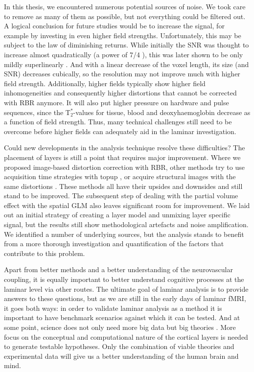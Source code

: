In this thesis, we encountered numerous potential sources of noise. We took care to remove as many of them as possible, but not everything could be filtered out. A logical conclusion for future studies would be to increase the signal, for example by investing in even higher field strengths. Unfortunately, this may be subject to the law of diminishing returns. While initially the SNR was thought to increase almost quadratically (a power of 7/4 \cite{Hoult1979}), this was later shown to be only mildly superlinearly \cite{Hoult2000}. And with a linear decrease of the voxel length, its size (and SNR) decreases cubically, so the resolution may not improve much with higher field strength. Additionally, higher fields typically show higher field inhomogeneities and consequently higher distortions that cannot be corrected with RBR anymore. It will also put higher pressure on hardware and pulse sequences, since the T$_2^*$-values for tissue, blood and deoxyhaemoglobin decrease as a function of field strength. Thus, many technical challenges still need to be overcome before higher fields can adequately aid in the laminar investigation.

Could new developments in the analysis technique resolve these difficulties? The placement of layers is still a point that requires major improvement. Where we proposed image-based distortion correction with RBR, other methods try to use acquisition time strategies with topup \cite{Smith2004}, or acquire structural images with the same distortions \cite{Kashyap2017}. These methods all have their upsides and downsides and still stand to be improved. The subsequent step of dealing with the partial volume effect with the spatial GLM also leaves significant room for improvement. We laid out an initial strategy of creating a layer model and unmixing layer specific signal, but the results still show methodological artefacts and noise amplification. We identified a number of underlying sources, but the analysis stands to benefit from a more thorough investigation and quantification of the factors that contribute to this problem. 

Apart from better methods and a better understanding of the neurovascular coupling, it is equally important to better understand cognitive processes at the laminar level via other routes. The ultimate goal of laminar analysis is to provide answers to these questions, but as we are still in the early days of laminar fMRI, it goes both ways: in order to validate laminar analysis as a method it is important to have benchmark scenarios against which it can be tested. And at some point, science does not only need more big data but big theories \cite{Jensen2014}. More focus on the conceptual and computational nature of the cortical layers is needed to generate testable hypotheses. Only the combination of viable theories and experimental data will give us a better understanding of the human brain and mind. 




